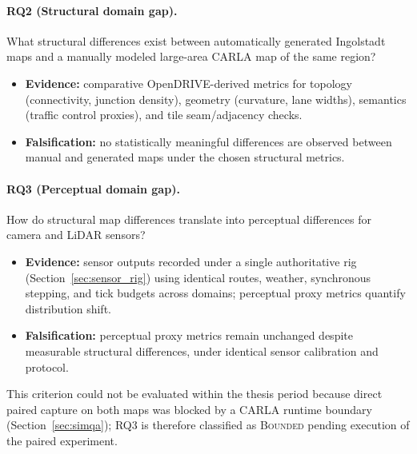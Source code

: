 \paragraph{RQ2 (Structural domain gap).}
What structural differences exist between automatically generated Ingolstadt maps and a manually modeled large-area CARLA map of the same region?
\begin{itemize}
  \item \textbf{Evidence:} comparative OpenDRIVE-derived metrics for topology (connectivity, junction density), geometry (curvature, lane widths), semantics (traffic control proxies), and tile seam/adjacency checks.
  \item \textbf{Falsification:} no statistically meaningful differences are observed between manual and generated maps under the chosen structural metrics.
\end{itemize}

\paragraph{RQ3 (Perceptual domain gap).}
How do structural map differences translate into perceptual differences for camera and LiDAR sensors?
\begin{itemize}
  \item \textbf{Evidence:} sensor outputs recorded under a single authoritative rig (Section~\ref{sec:sensor_rig}) using identical routes, weather, synchronous stepping, and tick budgets across domains; perceptual proxy metrics quantify distribution shift.
  \item \textbf{Falsification:} perceptual proxy metrics remain unchanged despite measurable structural differences, under identical sensor calibration and protocol.
\end{itemize}
This criterion could not be evaluated within the thesis period because direct paired capture on both maps was blocked by a CARLA runtime boundary (Section~\ref{sec:simqa}); RQ3 is therefore classified as \textsc{Bounded} pending execution of the paired experiment.

